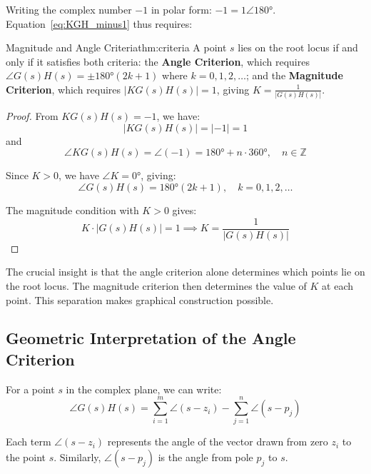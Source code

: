 Writing the complex number $-1$ in polar form: $-1 = 1 \angle 180°$. Equation~\eqref{eq:KGH_minus1} thus requires:

\begin{theorem}{Magnitude and Angle Criteria}{thm:criteria}
A point $s$ lies on the root locus if and only if it satisfies both criteria: the \textbf{Angle Criterion}, which requires $\angle G(s)H(s) = \pm 180°(2k+1)$ where $k = 0, 1, 2, \ldots$; and the \textbf{Magnitude Criterion}, which requires $|KG(s)H(s)| = 1$, giving $K = \frac{1}{|G(s)H(s)|}$.
\end{theorem}

\begin{proof}
From $KG(s)H(s) = -1$, we have:
\[
|KG(s)H(s)| = |-1| = 1
\]
and
\[
\angle KG(s)H(s) = \angle(-1) = 180° + n \cdot 360°, \quad n \in \mathbb{Z}
\]

Since $K > 0$, we have $\angle K = 0°$, giving:
\[
\angle G(s)H(s) = 180°(2k+1), \quad k = 0, 1, 2, \ldots
\]

The magnitude condition with $K > 0$ gives:
\[
K \cdot |G(s)H(s)| = 1 \implies K = \frac{1}{|G(s)H(s)|}
\]
\end{proof}

The crucial insight is that the angle criterion alone determines which points lie on the root locus. The magnitude criterion then determines the value of $K$ at each point. This separation makes graphical construction possible.

\subsection{Geometric Interpretation of the Angle Criterion}

For a point $s$ in the complex plane, we can write:
\begin{equation}
\angle G(s)H(s) = \sum_{i=1}^{m} \angle(s-z_i) - \sum_{j=1}^{n} \angle(s-p_j)
\label{eq:angle_sum}
\end{equation}

Each term $\angle(s-z_i)$ represents the angle of the vector drawn from zero $z_i$ to the point $s$. Similarly, $\angle(s-p_j)$ is the angle from pole $p_j$ to $s$.

